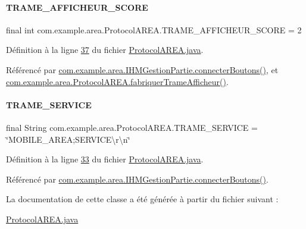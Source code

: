 \paragraph{\texorpdfstring{T\+R\+A\+M\+E\+\_\+\+A\+F\+F\+I\+C\+H\+E\+U\+R\+\_\+\+S\+C\+O\+RE}{TRAME\_AFFICHEUR\_SCORE}}
{\footnotesize\ttfamily final int com.\+example.\+area.\+Protocol\+A\+R\+E\+A.\+T\+R\+A\+M\+E\+\_\+\+A\+F\+F\+I\+C\+H\+E\+U\+R\+\_\+\+S\+C\+O\+RE = 2\hspace{0.3cm}{\ttfamily [static]}}



Définition à la ligne \hyperlink{_protocol_a_r_e_a_8java_source_l00037}{37} du fichier \hyperlink{_protocol_a_r_e_a_8java_source}{Protocol\+A\+R\+E\+A.\+java}.



Référencé par \hyperlink{_i_h_m_gestion_partie_8java_source_l00346}{com.\+example.\+area.\+I\+H\+M\+Gestion\+Partie.\+connecter\+Boutons()}, et \hyperlink{_protocol_a_r_e_a_8java_source_l00048}{com.\+example.\+area.\+Protocol\+A\+R\+E\+A.\+fabriquer\+Trame\+Afficheur()}.

\mbox{\label{classcom_1_1example_1_1area_1_1_protocol_a_r_e_a_ab835cea072ee1568a285250debc1b3be}} 
\paragraph{\texorpdfstring{T\+R\+A\+M\+E\+\_\+\+S\+E\+R\+V\+I\+CE}{TRAME\_SERVICE}}
{\footnotesize\ttfamily final String com.\+example.\+area.\+Protocol\+A\+R\+E\+A.\+T\+R\+A\+M\+E\+\_\+\+S\+E\+R\+V\+I\+CE = \char`\"{}M\+O\+B\+I\+L\+E\+\_\+\+A\+R\+EA;S\+E\+R\+V\+I\+C\+E\textbackslash{}r\textbackslash{}n\char`\"{}\hspace{0.3cm}{\ttfamily [static]}}



Définition à la ligne \hyperlink{_protocol_a_r_e_a_8java_source_l00033}{33} du fichier \hyperlink{_protocol_a_r_e_a_8java_source}{Protocol\+A\+R\+E\+A.\+java}.



Référencé par \hyperlink{_i_h_m_gestion_partie_8java_source_l00346}{com.\+example.\+area.\+I\+H\+M\+Gestion\+Partie.\+connecter\+Boutons()}.



La documentation de cette classe a été générée à partir du fichier suivant \+:\begin{DoxyCompactItemize}
\item 
\hyperlink{_protocol_a_r_e_a_8java}{Protocol\+A\+R\+E\+A.\+java}\end{DoxyCompactItemize}
